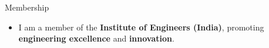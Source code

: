 \documentclass{my_cv}
\begin{document}
\begin{multicols}{2}
\begin{itemize}[noitemsep]
\end{itemize}


\section{\faStar}{Membership}

\begin{itemize}[noitemsep]
\item I am a member of the \textbf{Institute of Engineers (India)}, promoting \textbf{engineering excellence} and \textbf{innovation}.

\end{itemize}




\end{multicols}
\end{document}
